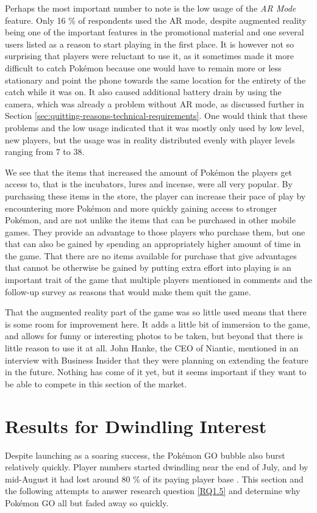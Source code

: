Perhaps the most important number to note is the low usage of the \emph{AR Mode} feature. Only 16 \% of respondents used the AR mode, despite augmented reality being one of the important features in the promotional material and one several users listed as a reason to start playing in the first place. It is however not so surprising that players were reluctant to use it, as it sometimes made it more difficult to catch Pokémon because one would have to remain more or less stationary and point the phone towards the same location for the entirety of the catch while it was on. It also caused additional battery drain by using the camera, which was already a problem without AR mode, as discussed further in Section \ref{sec:quitting-reasons-technical-requirements}. One would think that these problems and the low usage indicated that it was mostly only used by low level, new players, but the usage was in reality distributed evenly with player levels ranging from 7 to 38.

We see that the items that increased the amount of Pokémon the players get access to, that is the incubators, lures and incense, were all very popular. By purchasing these items in the store, the player can increase their pace of play by encountering more Pokémon and more quickly gaining access to stronger Pokémon, and are not unlike the items that can be purchased in other mobile games. They provide an advantage to those players who purchase them, but one that can also be gained by spending an appropriately higher amount of time in the game. That there are no items available for purchase that give advantages that cannot be otherwise be gained by putting extra effort into playing is an important trait of the game that multiple players mentioned in comments and the follow-up survey as reasons that would make them quit the game.

That the augmented reality part of the game was so little used means that there is some room for improvement here. It adds a little bit of immersion to the game, and allows for funny or interesting photos to be taken, but beyond that there is little reason to use it at all. John Hanke, the CEO of Niantic, mentioned in an interview with Business Insider \cite{businessinsiderPogoFuture} that they were planning on extending the feature in the future. Nothing has come of it yet, but it seems important if they want to be able to compete in this section of the market.

\section{Results for Dwindling Interest}
Despite launching as a soaring success, the Pokémon GO bubble also burst relatively quickly. Player numbers started dwindling near the end of July, and by mid-August it had lost around 80 \% of its paying player base \cite{newseverydayPlayerBase}\cite{forbesPogoMoney}. This section and the following attempts to answer research question \ref{RQ1.5} and determine why Pokémon GO all but faded away so quickly.

